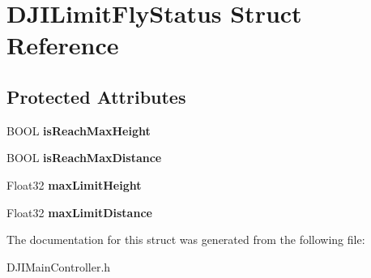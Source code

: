 \hypertarget{struct_d_j_i_limit_fly_status}{\section{D\+J\+I\+Limit\+Fly\+Status Struct Reference}
\label{struct_d_j_i_limit_fly_status}
}
\subsection*{Protected Attributes}
\begin{DoxyCompactItemize}
\item 
\hypertarget{struct_d_j_i_limit_fly_status_a9a4cb948196626d43241b068f38d3d65}{B\+O\+O\+L {\bfseries is\+Reach\+Max\+Height}}\label{struct_d_j_i_limit_fly_status_a9a4cb948196626d43241b068f38d3d65}

\item 
\hypertarget{struct_d_j_i_limit_fly_status_a6b3b93eefacd0d511bcbbcdd4ecc8bb1}{B\+O\+O\+L {\bfseries is\+Reach\+Max\+Distance}}\label{struct_d_j_i_limit_fly_status_a6b3b93eefacd0d511bcbbcdd4ecc8bb1}

\item 
\hypertarget{struct_d_j_i_limit_fly_status_aa57d194d52e9f9230246e95cb4f45448}{Float32 {\bfseries max\+Limit\+Height}}\label{struct_d_j_i_limit_fly_status_aa57d194d52e9f9230246e95cb4f45448}

\item 
\hypertarget{struct_d_j_i_limit_fly_status_a9c3e913b5e425fcc81b0eb061ed4a041}{Float32 {\bfseries max\+Limit\+Distance}}\label{struct_d_j_i_limit_fly_status_a9c3e913b5e425fcc81b0eb061ed4a041}

\end{DoxyCompactItemize}


The documentation for this struct was generated from the following file\+:\begin{DoxyCompactItemize}
\item 
D\+J\+I\+Main\+Controller.\+h\end{DoxyCompactItemize}
